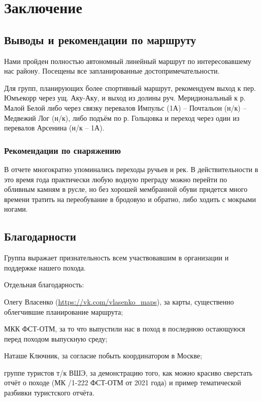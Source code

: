 \section{Заключение}
\subsection{Выводы и рекомендации по маршруту}
Нами пройден полностью автономный линейный маршрут по интересовавшему нас району.
Посещены все запланированные достопримечательности.

Для групп, планирующих более спортивный маршрут, рекомендуем выход к пер. Юмъекорр через ущ. Аку-Аку,
и выход из долины руч. Меридиональный к р. Малой Белой либо через связку
перевалов Импульс (1А) -- Почтальон (н/к) -- Медвежий Лог (н/к), либо подъём по р. Гольцовка
и переход через один из перевалов Арсенина (н/к -- 1А).

\subsubsection*{Рекомендации по снаряжению}
В отчете многократно упоминались переходы ручьев и рек.
В действительности в это время года практически любую водную преграду можно перейти по обливным камням в русле,
но без хорошей мембранной обуви придется много времени тратить на переобувание в бродовую и обратно,
либо ходить с мокрыми ногами.

\subsection{Благодарности}
Группа выражает признательность всем участвовавшим в организации и поддержке нашего похода.

Отдельная благодарность:

Олегу Власенко (\url{https://vk.com/vlasenko_maps}), за карты, существенно облегчившие планирование маршрута;

МКК ФСТ-ОТМ, за то что выпустили нас в поход в последнюю остающуюся перед походом выпускную среду;

Наташе Ключник, за согласие побыть координатором в Москве;

группе туристов т/к ВШЭ, за демонстрацию того, как можно красиво сверстать отчёт о походе
(МК /1-222 ФСТ-ОТМ от 2021 года) и пример тематической разбивки туристского отчёта.
